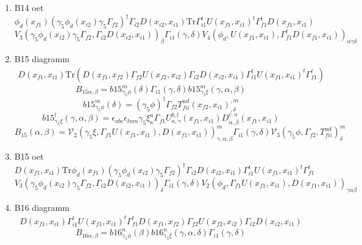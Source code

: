 \documentclass{article}[12pt]
\begin{document}
\begin{itemize}
\begin{enumerate}
$$$$
$$
B_{14}\left(\alpha,\beta\right)={\mathcal V}_{3}\left(\gamma_5\phi,\Gamma_{f2},T_{fii}^{ud}\right)^{m}_{\beta}\Gamma_{i1}\left(\gamma,\delta\right){\mathcal V}_{4}\left(\gamma_5\xi,\Gamma_{f1}U,D\right)^{m}_{\alpha,\gamma,\delta}
$$
\item B14 oet
$$
\phi_d(x_{f1})(\gamma_5\phi_d(x_{i2})\gamma_5\Gamma_{f2})^{\dagger}\Gamma_{i2}D(x_{i2},x_{i1})\mathrm{Tr}\Gamma_{i1}^t U(x_{f1},x_{i1})^t\Gamma_{f1}^t D(x_{f1},x_{i1})
$$
$$
V_3(\gamma_5\phi_d(x_{i2})\gamma_5\Gamma_{f2},\Gamma_{i2}D(x_{i2},x_{i1}))_{\beta}\Gamma_{i1}(\gamma,\delta)V_4(\phi_d,U(x_{f1},x_{i1}),\Gamma_{f1}^tD(x_{f1},x_{i1}))_{\alpha\gamma\delta}
$$

\item B15 diagramm
\begin{eqnarray}
D(x_{f1},x_{i1})\mathrm{Tr}\left(D(x_{f1},x_{f2})\Gamma_{f2}U(x_{f2},x_{i2})\Gamma_{i2}D(x_{i2},x_{i1})\Gamma_{i1}^tU(x_{f1},x_{i1})^t\Gamma_{f1}^t\right)
\end{eqnarray}
$$
B_{15\alpha,\beta}=b15_{\gamma_5\phi}^{m}\left(\delta\right)\Gamma_{i1}\left(\gamma,\delta\right)b15_{\gamma_5\xi}^{m}\left(\gamma,\alpha,\beta\right)
$$
$$
b15_{\gamma_5\phi}^{m}\left(\delta\right)=(\gamma_5\phi)^{\dagger}\Gamma_{f2}T_{fii}^{ud}\left(x_{f2},x_{i1}\right)^{,m}_{,\delta}
$$
$$
b15_{\gamma_5\xi}^{l}\left(\gamma,\alpha,\beta\right)=\epsilon_{abc}\epsilon_{lmn}\gamma_5\xi^{a}_{\kappa}\Gamma_{f1}U_{\kappa,\gamma}^{b,l}\left(x_{f1},x_{i1}\right)D^{c,n}_{\alpha,\beta}\left(x_{f1},x_{i1}\right)
$$
$$
B_{15}\left(\alpha,\beta\right)={\mathcal V}_2\left(\gamma_5\xi,\Gamma_{f1}U\left(x_{f1},x_{i1}\right),D\left(x_{f1},x_{i1}\right)\right)^{m}_{\gamma,\alpha,\beta}\Gamma_{i1}\left(\gamma,\delta\right){\mathcal V}_3\left(\gamma_5\phi,\Gamma_{f2},T_{fii}^{ud}\right)^{m}_{\delta}
$$
\item B15 oet
$$
D(x_{f1},x_{i1})\mathrm{Tr}\phi_d(x_{f1})(\gamma_5\phi_d(x_{i2})\gamma_5\Gamma_{f2})^{\dagger}\Gamma_{i2}D(x_{i2},x_{i1})\Gamma_{i1}^t U(x_{f1},x_{i1})^t\Gamma_{f1}^t 
$$
$$
V_3(\gamma_5\phi_d(x_{i2})\gamma_5\Gamma_{f2},\Gamma_{i2}D(x_{i2},x_{i1}))_{\delta}\Gamma_{i1}(\gamma,\delta)V_2(\phi_d,\Gamma_{f1}U(x_{f1},x_{i1}),D(x_{f1},x_{i1}))_{\gamma\alpha\beta}
$$
\item B16 diagramm
\begin{eqnarray}
D(x_{f1},x_{i1})\Gamma_{i1}^tU(x_{f1},x_{i1})^t\Gamma_{f1}^tD(x_{f1},x_{f2})\Gamma_{f2}U(x_{f2},x_{i2})\Gamma_{i2}D(x_{i2},x_{i1}) 
\end{eqnarray}
$$
B_{16\alpha,\beta}=b16_{\gamma_5\phi}^n\left(\beta\right)b16_{\gamma_5\xi}^n\left(\gamma,\alpha,\delta\right)\Gamma_{i1}\left(\gamma,\delta\right)
$$
\end{enumerate}
\end{itemize}
\end{document}
